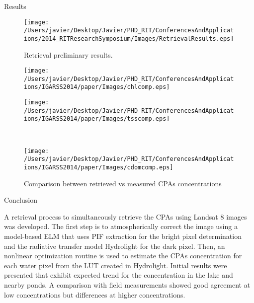 \documentclass[mathserif]{beamer}
\begin{document}
\begin{frame}{}
\begin{columns}[t]
\begin{column}{.3\linewidth}
\begin{block}{Results}
\begin{figure}[htb]
\centering
\texttt{[image: /Users/javier/Desktop/Javier/PHD\_RIT/ConferencesAndApplications/2014\_RITResearchSymposium/Images/RetrievalResults.eps]}
   \caption{Retrieval preliminary results.}
      \label{fig:retrievalresults} 
\end{figure}

\begin{figure}[htb]
  \begin{minipage}[c]{0.48\linewidth}
    \centering
      \texttt{[image: /Users/javier/Desktop/Javier/PHD\_RIT/ConferencesAndApplications/IGARSS2014/paper/Images/chlcomp.eps]} 
      \vspace{.3cm}
      \label{fig:chlcomp} 
  \end{minipage}
  \hfill
  \begin{minipage}[d]{0.48\linewidth}
    \centering
      \texttt{[image: /Users/javier/Desktop/Javier/PHD\_RIT/ConferencesAndApplications/IGARSS2014/paper/Images/tsscomp.eps]}   
      \vspace{.3cm}
      \label{fig:tsscomp} 
  \end{minipage}
  \\
  \begin{minipage}[d]{0.48\linewidth}
    \centering
      \texttt{[image: /Users/javier/Desktop/Javier/PHD\_RIT/ConferencesAndApplications/IGARSS2014/paper/Images/cdomcomp.eps]}    
      \vspace{.3cm}
      \label{fig:cdomcomp}
  \end{minipage}  
  \caption{Comparison between retrieved vs measured CPAs concentrations}
\end{figure}          


\end{block}  


\begin{block}{Conclusion}
	
\justifying\small A retrieval process to simultaneously retrieve the CPAs using Landsat 8 images was developed. The first step is to atmospherically correct the image using a model-based ELM that uses PIF extraction for the bright pixel determination and the radiative transfer model Hydrolight for the dark pixel. Then, an nonlinear optimization routine is used to estimate the CPAs concentration for each water pixel from the LUT created in Hydrolight. Initial results were presented that exhibit expected trend for the concentration in the lake and nearby ponds. A comparison with field measurements showed good agreement at low concentrations but differences at higher concentrations.
\vspace{.3cm}
\end{block}



\end{column}
\end{columns}
\end{frame}
\end{document}
